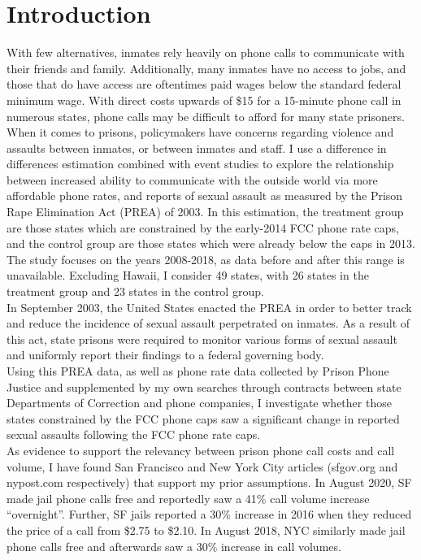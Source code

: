 \documentclass[12pt,a4paper]{article}
\begin{document}
\section{Introduction}
With few alternatives, inmates rely heavily on phone calls to communicate with their friends and family. Additionally, many inmates have no access to jobs, and those that do have access are oftentimes paid wages below the standard federal minimum wage. With direct costs upwards of \$15 for a 15-minute phone call in numerous states, phone calls may be difficult to afford for many state prisoners. \\

When it comes to prisons, policymakers have concerns regarding violence and assaults between inmates, or between inmates and staff. I use a difference in differences estimation combined with event studies to explore the relationship between increased ability to communicate with the outside world via more affordable phone rates, and reports of sexual assault as measured by the Prison Rape Elimination Act (PREA) of 2003. In this estimation, the treatment group are those states which are constrained by the early-2014 FCC phone rate caps, and the control group are those states which were already below the caps in 2013. The study focuses on the years 2008-2018, as data before and after this range is unavailable. Excluding Hawaii, I consider 49 states, with 26 states in the treatment group and 23 states in the control group. \\ 

In September 2003, the United States enacted the PREA in order to better track and reduce the incidence of sexual assault perpetrated on inmates. As a result of this act, state prisons were required to monitor various forms of sexual assault and uniformly report their findings to a federal governing body. \\

Using this PREA data, as well as phone rate data collected by Prison Phone Justice and supplemented by my own searches through contracts between state Departments of Correction and phone companies, I investigate whether those states constrained by the FCC phone caps saw a significant change in reported sexual assaults following the FCC phone rate caps. \\

As evidence to support the relevancy between prison phone call costs and call volume, I have found San Francisco and New York City articles (sfgov.org and nypost.com respectively) that support my prior assumptions. In August 2020, SF made jail phone calls free and reportedly saw a 41\% call volume increase ``overnight''. Further, SF jails reported a 30\% increase in 2016 when they reduced the price of a call from \$2.75 to \$2.10. In August 2018, NYC similarly made jail phone calls free and afterwards saw a 30\% increase in call volumes. \\
\end{document}
